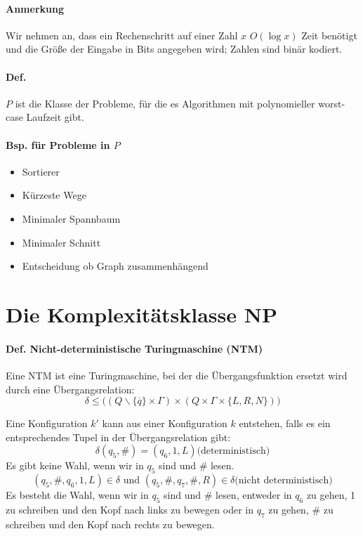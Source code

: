 \paragraph*{Anmerkung} Wir nehmen an, dass ein Rechenschritt auf einer Zahl $x$ $O(\log x)$ Zeit benötigt und die Größe der Eingabe in Bits angegeben wird; Zahlen sind binär kodiert.

\paragraph*{Def.} $P$ ist die Klasse der Probleme, für die es Algorithmen mit polynomieller worst-case Laufzeit gibt.

\paragraph*{Bsp. für Probleme in $P$}
\begin{itemize}
	\item Sortierer
	\item Kürzeste Wege
	\item Minimaler Spannbaum
	\item Minimaler Schnitt
	\item Entscheidung ob Graph zusammenhängend
\end{itemize}


\section*{Die Komplexitätsklasse NP}

\paragraph*{Def. Nicht-deterministische Turingmaschine (NTM)} Eine NTM ist eine Turingmaschine, bei der die Übergangsfunktion ersetzt wird durch eine Übergangsrelation: $$ \delta\leq \Big( (Q\backslash\{\overline{q}\} \times \Gamma) \times (Q \times \Gamma \times \{ L,R,N \}) \Big) $$

Eine Konfiguration $k'$ kann aus einer  Konfiguration $k$ entstehen, falls es ein entsprechendes Tupel in der Übergangsrelation gibt: $$ \delta(q_5,\#)=(q_6,1,L) \text{(deterministisch)} $$ Es gibt keine Wahl, wenn wir in $q_5$ sind und \# lesen.
$$ (q_5,\#,q_6,1,L) \in \delta \text{ und } (q_5,\#,q_7,\#,R) \in \delta \text{(nicht deterministisch)}$$ Es besteht die Wahl, wenn wir in $q_5$ sind und \# lesen, entweder in $q_6$ zu gehen, 1 zu schreiben und den Kopf nach links zu bewegen oder in $q_7$ zu gehen, \# zu schreiben und den Kopf nach rechts zu bewegen.

